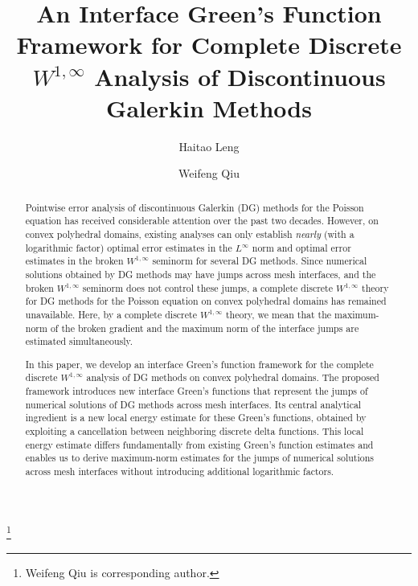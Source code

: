 \documentclass[1996/10/24]{amsart}
\theoremstyle{definition}
\numberwithin{equation}{section}
\begin{document}
\title[An Interface Green's Function Framework]{An Interface Green's Function Framework for Complete Discrete
$W^{1,\infty}$ Analysis of Discontinuous Galerkin Methods}

\author{Haitao Leng}
\address{School of Mathematics and Information Science, Guangzhou University, Guangzhou 510006, Guangdong, China}


\author{Weifeng Qiu}
\address{Department of Mathematics, City University of Hong Kong, Hong Kong, China}

\thanks{Weifeng Qiu is corresponding author.}



\begin{abstract}
Pointwise error analysis of discontinuous Galerkin (DG) methods for the Poisson equation has received considerable attention over the past two decades. However, on convex polyhedral domains, existing analyses can only establish
\emph{nearly} (with a logarithmic factor) optimal error estimates in the $L^{\infty}$ norm and optimal error estimates in the broken $W^{1,\infty}$ seminorm for several DG methods. Since numerical solutions obtained by DG methods may have jumps
across mesh interfaces, and the broken $W^{1,\infty}$ seminorm does not control these jumps, a complete discrete
$W^{1,\infty}$ theory for DG methods for the Poisson equation on convex polyhedral domains has remained unavailable.
Here, by a complete discrete $W^{1,\infty}$ theory, we mean that the maximum-norm of the broken gradient and
the maximum norm of the interface jumps are estimated simultaneously.

In this paper, we develop an interface Green's function framework for the complete discrete $W^{1,\infty}$ analysis of DG methods on convex polyhedral domains. The proposed framework introduces new interface Green's functions that represent the jumps of numerical solutions of DG methods across mesh interfaces. Its central analytical ingredient is a new local energy estimate for these Green's functions, obtained by exploiting a cancellation between neighboring discrete delta functions. This local energy estimate differs fundamentally from existing Green's function estimates and enables us to derive maximum-norm estimates for the jumps of numerical solutions across mesh interfaces without
introducing additional logarithmic factors.


\end{abstract}
\end{document}
